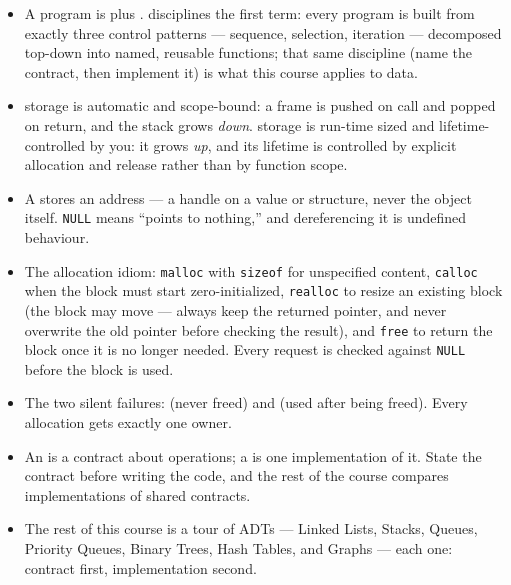 \documentclass[11pt]{article}
\begin{document}
\begin{itemize}
  \item A program is  plus .
     disciplines the first term: every program is
    built from exactly three control patterns --- sequence, selection,
    iteration --- decomposed top-down into named, reusable functions; that
    same discipline (name the contract, then implement it) is what this
    course applies to data.
  \item {} storage is automatic and scope-bound: a frame is pushed on
    call and popped on return, and the stack grows \emph{down}. 
    storage is run-time sized and lifetime-controlled by you: it grows
    \emph{up}, and its lifetime is controlled by explicit allocation and
    release rather than by function scope.
  \item A  stores an address --- a handle on a value or structure,
    never the object itself. \texttt{NULL} means ``points to nothing,'' and
    dereferencing it is undefined behaviour.
  \item The allocation idiom: \texttt{malloc} with \texttt{sizeof} for
    unspecified content, \texttt{calloc} when the block must start
    zero-initialized, \texttt{realloc} to resize an existing block (the block
    may move --- always keep the returned pointer, and never overwrite the old
    pointer before checking the result), and \texttt{free} to return the
    block once it is no longer needed. Every request is checked against
    \texttt{NULL} before the block is used.
  \item The two silent failures:  (never freed) and
     (used after being freed). Every allocation gets
    exactly one owner.
  \item An  is a contract about operations; a  is
    one implementation of it. State the contract before writing the code, and
    the rest of the course compares implementations of shared contracts.
  \item The rest of this course is a tour of ADTs --- Linked Lists, Stacks,
    Queues, Priority Queues, Binary Trees, Hash Tables, and
    Graphs --- each one: contract first, implementation second.
\end{itemize}



\end{document}
